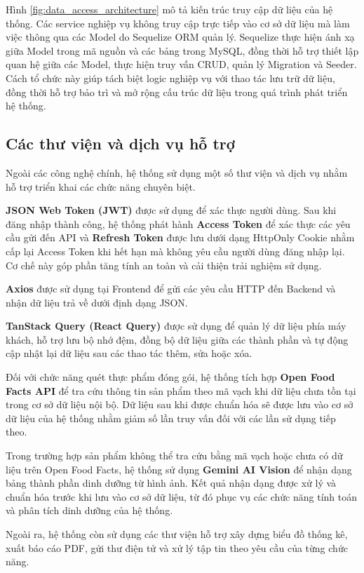 \documentclass[12pt, a4paper]{report}
\begin{document}
Hình \ref{fig:data_access_architecture} mô tả kiến trúc truy cập dữ liệu của hệ thống. Các service nghiệp vụ không truy cập trực tiếp vào cơ sở dữ liệu mà làm việc thông qua các Model do Sequelize ORM quản lý. Sequelize thực hiện ánh xạ giữa Model trong mã nguồn và các bảng trong MySQL, đồng thời hỗ trợ thiết lập quan hệ giữa các Model, thực hiện truy vấn CRUD, quản lý Migration và Seeder. Cách tổ chức này giúp tách biệt logic nghiệp vụ với thao tác lưu trữ dữ liệu, đồng thời hỗ trợ bảo trì và mở rộng cấu trúc dữ liệu trong quá trình phát triển hệ thống.

\subsection{Các thư viện và dịch vụ hỗ trợ}Ngoài các công nghệ chính, hệ thống sử dụng một số thư viện và dịch vụ nhằm hỗ trợ triển khai các chức năng chuyên biệt.

\textbf{JSON Web Token (JWT)} được sử dụng để xác thực người dùng. Sau khi đăng nhập thành công, hệ thống phát hành \textbf{Access Token} để xác thực các yêu cầu gửi đến API và \textbf{Refresh Token} được lưu dưới dạng HttpOnly Cookie nhằm cấp lại Access Token khi hết hạn mà không yêu cầu người dùng đăng nhập lại. Cơ chế này góp phần tăng tính an toàn và cải thiện trải nghiệm sử dụng.

\textbf{Axios} được sử dụng tại Frontend để gửi các yêu cầu HTTP đến Backend và nhận dữ liệu trả về dưới định dạng JSON.

\textbf{TanStack Query (React Query)} được sử dụng để quản lý dữ liệu phía máy khách, hỗ trợ lưu bộ nhớ đệm, đồng bộ dữ liệu giữa các thành phần và tự động cập nhật lại dữ liệu sau các thao tác thêm, sửa hoặc xóa.

Đối với chức năng quét thực phẩm đóng gói, hệ thống tích hợp \textbf{Open Food Facts API} để tra cứu thông tin sản phẩm theo mã vạch khi dữ liệu chưa tồn tại trong cơ sở dữ liệu nội bộ. Dữ liệu sau khi được chuẩn hóa sẽ được lưu vào cơ sở dữ liệu của hệ thống nhằm giảm số lần truy vấn đối với các lần sử dụng tiếp theo.

Trong trường hợp sản phẩm không thể tra cứu bằng mã vạch hoặc chưa có dữ liệu trên Open Food Facts, hệ thống sử dụng \textbf{Gemini AI Vision} để nhận dạng bảng thành phần dinh dưỡng từ hình ảnh. Kết quả nhận dạng được xử lý và chuẩn hóa trước khi lưu vào cơ sở dữ liệu, từ đó phục vụ các chức năng tính toán và phân tích dinh dưỡng của hệ thống.

Ngoài ra, hệ thống còn sử dụng các thư viện hỗ trợ xây dựng biểu đồ thống kê, xuất báo cáo PDF, gửi thư điện tử và xử lý tập tin theo yêu cầu của từng chức năng.
\end{document}
